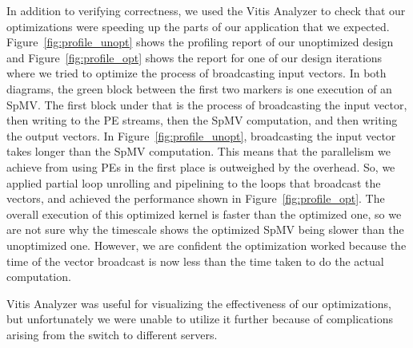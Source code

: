 \documentclass[10pt]{article}
\begin{document}
\noindent In addition to verifying correctness, we used the Vitis Analyzer to
check that our optimizations were speeding up the parts of our application that
we expected. Figure~\ref{fig:profile_unopt} shows the profiling report of our
unoptimized design and Figure~\ref{fig:profile_opt} shows the report for one of
our design iterations where we tried to optimize the process of broadcasting
input vectors. In both diagrams, the green block between the first two markers
is one execution of an SpMV. The first block under that is the process of
broadcasting the input vector, then writing to the PE streams, then the SpMV
computation, and then writing the output vectors. In
Figure~\ref{fig:profile_unopt}, broadcasting the input vector takes longer than the SpMV computation.
This means that the parallelism we achieve from using PEs in the first place is outweighed by the overhead.
So, we applied partial loop unrolling and pipelining to the loops that broadcast the vectors, and achieved the
performance shown in Figure~\ref{fig:profile_opt}. The overall execution of this optimized kernel is faster than
the optimized one, so we are not sure why the timescale shows the optimized SpMV being slower than the unoptimized one.
However, we are confident the optimization worked because the time of the vector broadcast is now less than the time
taken to do the actual computation. \newline

\noindent Vitis Analyzer was useful for visualizing the effectiveness of our optimizations, but unfortunately we
were unable to utilize it further because of complications arising from the switch to different servers.
\end{document}
